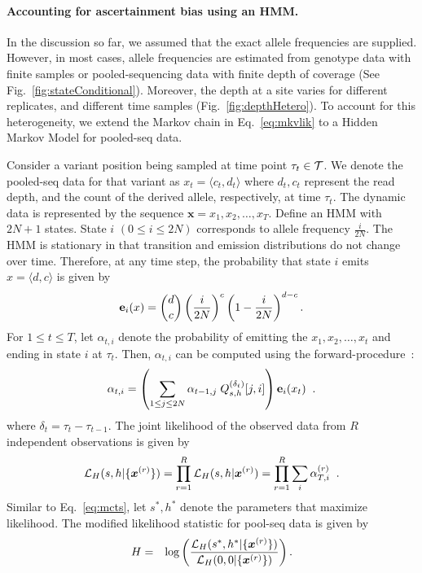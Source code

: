 \documentclass[11pt]{article}
\begin{document}
\paragraph{Accounting for ascertainment bias using an HMM.}
In the discussion so far, we assumed that the exact allele frequencies
are supplied. However, in most cases, allele frequencies are estimated
from genotype data with finite samples or pooled-sequencing data with
finite depth of coverage (See Fig.~\ref{fig:stateConditional}).
Moreover, the depth at a site varies for different replicates, and
different time samples (Fig.~\ref{fig:depthHetero}). To account for
this heterogeneity, we extend the Markov chain in Eq.~\ref{eq:mkvlik}
to a Hidden Markov Model for pooled-seq data.

Consider a variant position being sampled at time point $\tau_t\in
{\cal T}$. We denote the pooled-seq data for that variant as $x_t =
\langle c_t,d_t \rangle$ where $d_t, c_t$ represent the read depth,
and the count of the derived allele, respectively, at time
$\tau_t$. The dynamic data is represented by the sequence
$\mathbf{x}=x_1,x_2,\ldots,x_T$. Define an HMM with $2N+1$
states. State $i$ $(0\le i\le 2N)$ corresponds to allele frequency
$\frac{i}{2N}$. The HMM is stationary in that transition and emission
distributions do not change over time. Therefore, at any time step,
the probability that state $i$ emits $x=\langle d, c\rangle $ is given by
\begin{equation*}
{\bf e}_{i}(x) = {d \choose c} \left(\frac{i}{2N} \right)^c\left (1- \frac{i}{2N} \right)^{d-c}.
\end{equation*}
For $1\le t\le T$, let $\alpha_{t,i}$ denote the probability of
emitting the $x_1,x_2,\ldots,x_t$ and ending in state $i$ at
$\tau_t$. Then, $\alpha_{t,i}$ can be computed using the
forward-procedure~\cite{durbin1998biological}:
\begin{equation}
  \alpha_{t,i} = \left( \sum_{1\le j\le 2N} \alpha_{t-1,j}\;Q^{(\delta_t)}_{s,h}[j,i] \right) {\bf e}_{i}(x_t)\;\; .
  \label{eq:hmm}
\end{equation}
where $\delta_t=\tau_t-\tau_{t-1}$. The joint likelihood of the
observed data from $R$ independent observations is given by
\begin{equation}
  {\cal L}_{H}(s,h|\{\bm{x}^{(r)}\})=\prod_{r=1}^R{\cal L}_{H}(s,h|\bm{x}^{(r)}) = 
  \prod_{r=1}^R \sum_i\alpha_{T,i}^{(r)}\;\;.
  \label{eq:hmmlik}
\end{equation}
Similar to Eq.~\ref{eq:mcts}, let $s^*,h^*$ denote the parameters that
maximize likelihood. The modified likelihood statistic for pool-seq
data is given by
\begin{eqnarray}
H &=& \log 
\left(\frac{{\cal L}_H(s^*,h^*|\{\bm{x}^{(r)}\})}{{\cal L}_H(0,0|\{\bm{x}^{(r)}\})}\right).
\label{eq:hmmml}
\end{eqnarray}
\end{document}
